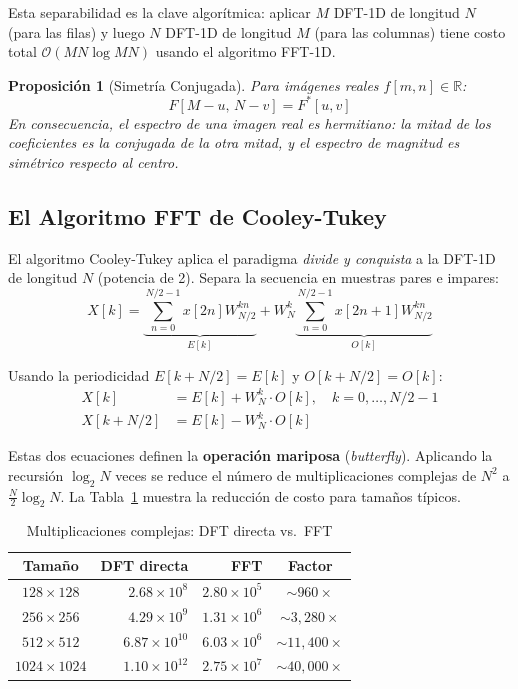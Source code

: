 \documentclass[conference]{IEEEtran}
\newtheorem{proposicion}{Proposición}
\begin{document}
Esta separabilidad es la clave algorítmica: aplicar $M$ DFT-1D de longitud $N$
(para las filas) y luego $N$ DFT-1D de longitud $M$ (para las columnas) tiene
costo total $\mathcal{O}(MN\log MN)$ usando el algoritmo FFT-1D.

\begin{proposicion}[Simetría Conjugada]
  Para imágenes reales $f[m,n]\in\mathbb{R}$:
  \begin{equation}
    F[M{-}u,\,N{-}v] = F^*[u,v]
    \label{eq:simetria}
  \end{equation}
  En consecuencia, el espectro de una imagen real es hermitiano: la
  mitad de los coeficientes es la conjugada de la otra mitad, y el
  espectro de magnitud es simétrico respecto al centro.
\end{proposicion}

\subsection{El Algoritmo FFT de Cooley-Tukey}

El algoritmo Cooley-Tukey \cite{cooley1967} aplica el paradigma
\textit{divide y conquista} a la DFT-1D de longitud $N$ (potencia de 2).
Separa la secuencia en muestras pares e impares:
\begin{equation}
  X[k] = \underbrace{\sum_{n=0}^{N/2-1}x[2n]W_{N/2}^{kn}}_{E[k]}
          + W_N^k\underbrace{\sum_{n=0}^{N/2-1}x[2n+1]W_{N/2}^{kn}}_{O[k]}
  \label{eq:fft_decimacion}
\end{equation}

Usando la periodicidad $E[k+N/2]=E[k]$ y $O[k+N/2]=O[k]$:
\begin{align}
  X[k]       &= E[k] + W_N^k\cdot O[k], \quad k=0,\ldots,N/2{-}1
  \label{eq:butterfly_a}\\
  X[k+N/2]   &= E[k] - W_N^k\cdot O[k]
  \label{eq:butterfly_b}
\end{align}

Estas dos ecuaciones definen la \textbf{operación mariposa} (\textit{butterfly}).
Aplicando la recursión $\log_2 N$ veces se reduce el número de multiplicaciones
complejas de $N^2$ a $\frac{N}{2}\log_2 N$. La Tabla~\ref{tab:complejidad}
muestra la reducción de costo para tamaños típicos.

\begin{table}[H]
  \centering
  \caption{Multiplicaciones complejas: DFT directa vs.\ FFT}
  \label{tab:complejidad}
  \begin{tabular}{crrc}
    \toprule
    \textbf{Tamaño} & \textbf{DFT directa} & \textbf{FFT} & \textbf{Factor} \\
    \midrule
    $128\!\times\!128$ & $2.68\times10^8$    & $2.80\times10^5$ & $\sim\!960\times$      \\
    $256\!\times\!256$ & $4.29\times10^9$    & $1.31\times10^6$ & $\sim\!3{,}280\times$  \\
    $512\!\times\!512$ & $6.87\times10^{10}$ & $6.03\times10^6$ & $\sim\!11{,}400\times$ \\
    $1024\!\times\!1024$ & $1.10\times10^{12}$ & $2.75\times10^7$ & $\sim\!40{,}000\times$ \\
    \bottomrule
  \end{tabular}
\end{table}
\end{document}
